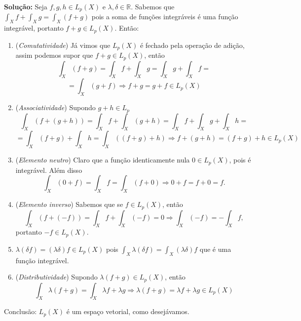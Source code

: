 \documentclass{article}
\begin{document}
\begin{enumerate}
\begin{enumerate}
			\textbf{Solução:} Seja $f, g, h \in L_{p}(X)$ e $\lambda, \delta \in \mathbb{R}$. Sabemos que $\int_{X}f  + \int_{X} g = \int_{X}(f+g)$ pois a soma de funções integráveis é uma função integrável, portanto $f+g \in L_{p}(X)$. Então:
				\begin{enumerate}
					\item (\textit{Comutatividade}) Já vimos que $L_{p}(X)$ é fechado pela operação de adição, assim podemos supor que $f +g \in L_{p}(X)$, então 
					$$
					\int_{X}(f+g) = \int_{X}f+ \int_{X}g =  \int_{X}g+ \int_{X}f =
					$$
					$$
					= \int_{X}(g+ f)  \Rightarrow f+g = g+f \in L_{p}(X)
					$$
					
					\item (\textit{Associatividade}) Supondo $g+h \in L_{p}$
					$$
					\int_{X} (f+(g+h)) = \int_{X} f+ \int_{X}(g+h) = \int_{X} f+ \int_{X} g + \int_{X}h = 
					$$
					$$
					=\int_{X} (f+g) +\int_{X} h = \int_{X}((f+g)+h) \Rightarrow f+(g+h)=(f+g)+h \in L_{p}(X)
					$$
					
					\item (\textit{Elemento neutro}) Claro que a função identicamente nula $0 \in L_{p}(X) $, pois é integrável. Além disso 
					$$
					\int_{X}(0 + f) = \int_{X} f = \int_{X}(f + 0) \Rightarrow 0 + f = f +0 = f.
					$$
					 
					\item (\textit{Elemento inverso}) Sabemos que se $f \in L_{p}(X)$, então 
					$$
					\int_{X}(f + (-f)) = \int_{X} f +\int_{X}(-f)  = 0 \Rightarrow \int_{X}(-f) = - \int_{X}f, 
					$$
					portanto $-f \in L_{p}(X)$.
					
					\item $\lambda(\delta f) = (\lambda \delta) f \in L_{p}(X) $ pois  $\int_{X} \lambda(\delta f) = \int_{X} (\lambda\delta)f$ que é uma função integrável.
					
					\item (\textit{Distributividade}) Supondo $\lambda (f+g) \in L_{p}(X) $, então
					$$
					\int_{X} \lambda (f+g) = \int_{X} \lambda f+ \lambda g \Rightarrow \lambda (f+g)  = \lambda f + \lambda g \in L_{p}(X)
					$$
				\end{enumerate}
				Conclusão: $L_{p}(X)$ é um espaço vetorial, como desejávamos.
				

\end{enumerate}
\end{enumerate}
\end{document}
